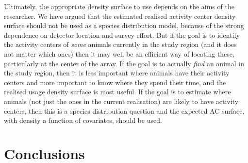 \documentclass[10pt,a4paper]{article}
\begin{document}
Ultimately, the appropriate density surface to use depends on the aims of the researcher. We have argued that the estimated realised activity center density surface should not be used as a species distribution model, because of the strong dependence on detector location and survey effort. But if the goal is to identify the activity centers of {\it some} animals currently in the study region (and it does not matter which ones) then it may well be an efficient way of locating these, particularly at the center of the array. If the goal is to actually {\it find} an animal in the study region, then it is less important where animals have their activity centers and more important to know where they spend their time, and the realised usage density surface is most useful. If the goal is to estimate where animals (not just the ones in the current realisation) are likely to have activity centers, then this is a species distribution question and the expected AC surface, with density a function of covariates, should be used.

\section{Conclusions}
\end{document}
